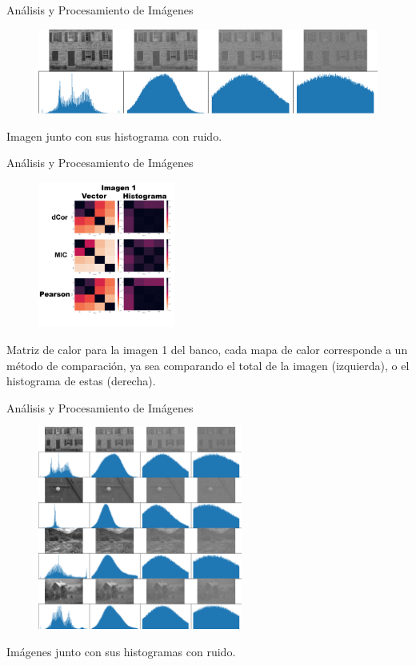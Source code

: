\documentclass{beamer}
\begin{document}
\begin{frame}{Análisis y Procesamiento de Imágenes}
    \begin{figure}[H]
        \centering
        \includegraphics[width=\textwidth]{img_hist_noise_one.png}
    \end{figure}
    Imagen junto con sus histograma con ruido.
\end{frame}
\begin{frame}{Análisis y Procesamiento de Imágenes}
    \begin{figure}[H]
        \centering
        \includegraphics[width=0.4\textwidth]{heatmap_one.png}
    \end{figure}
    Matriz de calor para la imagen 1 del banco, cada mapa de calor corresponde a un m\'etodo de comparaci\'on, ya sea comparando el total de la imagen (izquierda), o el histograma de estas (derecha).
\end{frame}

\begin{frame}{Análisis y Procesamiento de Imágenes}
    \begin{figure}[H]
        \centering
        \includegraphics[width=0.6\textwidth]{img_hist_noise.png}
    \end{figure}
    Imágenes junto con sus histogramas con ruido.
\end{frame}
\end{document}
